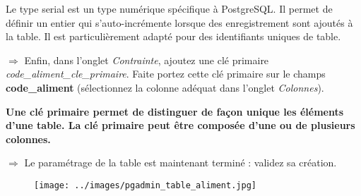 \documentclass[11pt]{article}
\begin{document}
			Le type serial est un type numérique spécifique à PostgreSQL. Il permet de définir un entier qui s'auto-incrémente lorsque des enregistrement sont ajoutés à la table. Il est particulièrement adapté pour des identifiants uniques de table.
			
			\vspace{1em}
			
			$\Rightarrow$ Enfin, dans l'onglet \textit{Contrainte}, ajoutez une clé primaire \textit{code\_aliment\_cle\_primaire}. Faite portez cette clé primaire sur le champs \textbf{code\_aliment} (sélectionnez la colonne adéquat dans l'onglet \textit{Colonnes}).
			
			\textbf{Une clé primaire permet de distinguer de façon unique les éléments d'une table. La clé primaire peut être composée d'une ou de plusieurs colonnes.} 
			
			$\Rightarrow$ Le paramétrage de la table est maintenant terminé : validez sa création.
			\begin{figure}[H]
				\center \texttt{[image: ../images/pgadmin\_table\_aliment.jpg]}\\[1em]
			\end{figure}
			
\end{document}
